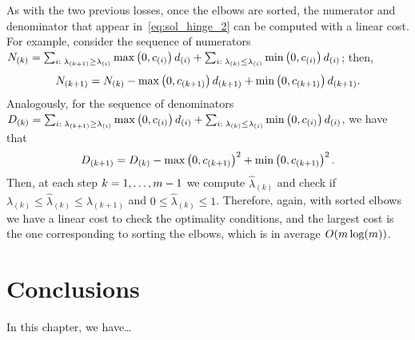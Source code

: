 As with the two previous losses, once the elbows are sorted, the numerator and denominator that appear in~\eqref{eq:sol_hinge_2} can be computed with a linear cost. For example, consider the sequence of numerators $N_{(k)} = \sum_{i:\; \lambda_{(k+1)} \geq \lambda_{(i)}} \max\left(0, c_{(i)}\right) d_{(i)} + \sum_{i:\; \lambda_{(k)} \leq \lambda_{(i)}} \min\left(0, c_{(i)}\right) d_{(i)}$; then, 
$$N_{(k+1)} = N_{(k)} - \max\left(0, c_{(k+1)}\right) d_{(k+1)} + \min\left(0, c_{(k+1)}\right) d_{(k+1)}.$$
Analogously, for the sequence of denominators $D_{(k)} = \sum_{i:\; \lambda_{(k+1)} \geq \lambda_{(i)}} \max\left(0, c_{(i)}\right) d_{(i)} + \sum_{i:\; \lambda_{(k)} \leq \lambda_{(i)}} \min\left(0, c_{(i)}\right) d_{(i)}$, we have that 
$$D_{(k+1)} = D_{(k)} - \max\left(0, c_{(k+1)}\right)^2 + \min\left(0, c_{(k+1)}\right)^2.$$
Then, at each step $k=1, \ldots, m-1$ we compute $\widehat{\lambda}_{(k)}$ and check if $\lambda_{(k)} \leq \widehat{\lambda}_{(k)} \leq \lambda_{(k+1)}$ and $0 \leq \widehat{\lambda}_{(k)} \leq 1$.
Therefore, again, with sorted elbows we have a linear cost to check the optimality conditions, and the largest cost is the one corresponding to sorting the elbows, which is in average $O(m \log(m))$.




\section{Conclusions}\label{sec-conclusions-3}

In this chapter, we have\dots
